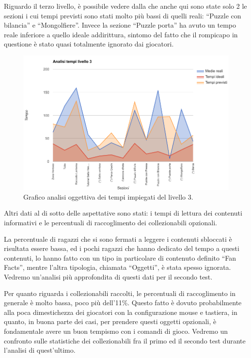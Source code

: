 Riguardo il terzo livello, è possibile vedere dalla  \myfig{\ref{fig:test_analisi_tempi_03}} che anche qui sono state solo 2 le sezioni i cui tempi previsti sono stati molto più bassi di quelli reali: ``Puzzle con bilancia'' e ``Mongolfiere''. Invece la sezione ``Puzzle porta'' ha avuto un tempo reale inferiore a quello ideale addirittura, sintomo del fatto che il rompicapo in questione è stato quasi totalmente ignorato dai giocatori.

\begin{figure}[h]
\centerline{\includegraphics[scale=0.45]{images/risultati/test_01_analisi_tempi_03.png}}
\caption{Grafico analisi oggettiva dei tempi impiegati del livello 3.}
\label{fig:test_analisi_tempi_03}
\end{figure}

Altri dati al di sotto delle aspettative sono stati: i tempi di lettura dei contenuti informativi e le percentuali di raccoglimento dei collezionabili opzionali. 

La percentuale di ragazzi che si sono fermati a leggere i contenuti sbloccati è risultata essere bassa, ed i pochi ragazzi che hanno dedicato del tempo a questi contenuti, lo hanno fatto con un tipo in particolare di contenuto definito ``Fan Facts'', mentre l'altra tipologia, chiamata ``Oggetti'', è stata spesso ignorata. Vedremo un'analisi più approfondita di questi dati per il secondo test.

Per quanto riguarda i collezionabili raccolti, le percentuali di raccoglimento in generale è molto bassa, poco più dell'11\%. Questo fatto è dovuto probabilmente alla poca dimestichezza dei giocatori con la configurazione mouse e tastiera, in quanto, in buona parte dei casi, per prendere questi oggetti opzionali, è fondamentale avere un buon tempismo con i comandi di gioco. Vedremo un confronto sulle statistiche dei collezionabili fra il primo ed il secondo test durante l'analisi di quest'ultimo.

